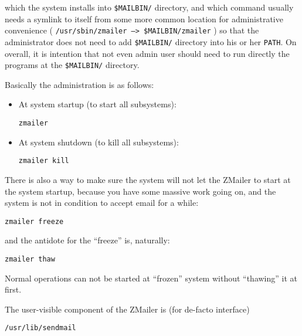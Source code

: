 which the system installs into {\tt \$MAILBIN/} directory, and which command usually needs a symlink to itself from some more common location for
administrative convenience
( {\tt /usr/sbin/zmailer --> \$MAILBIN/zmailer} )
so that the administrator does not need to add  {\tt \$MAILBIN/}  directory
into his or her {\tt PATH}.   On overall, it is intention that not even 
admin
user should need to run directly the programs at the {\tt \$MAILBIN/} directory.

Basically the administration is as follows:
\begin{itemize}
\item At system startup (to start all subsystems):
\begin{tscreen}
\begin{verbatim}
zmailer
\end{verbatim}
\end{tscreen}
\item At system shutdown (to kill all subsystems):
\begin{tscreen}
\begin{verbatim}
zmailer kill
\end{verbatim}
\end{tscreen}
\end{itemize}

There is also a way to make sure the system will not let the ZMailer
to start at the system startup, because you have some massive work
going on, and the system is not in condition to accept email for a while: 
\begin{tscreen}
\begin{verbatim}
zmailer freeze
\end{verbatim}
\end{tscreen}

and the antidote for the ``freeze'' is, naturally:
\begin{tscreen}
\begin{verbatim}
zmailer thaw
\end{verbatim}
\end{tscreen}

Normal operations can not be started at ``frozen'' system without ``thawing'' it at first.

The user-visible component of the ZMailer is (for de-facto interface)
\begin{tscreen}
\begin{verbatim}
/usr/lib/sendmail
\end{verbatim}
\end{tscreen}

